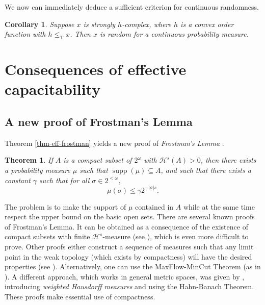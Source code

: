 \documentclass[11pt,reqno]{article}
\theoremstyle{plain}
\newtheorem{thm}{Theorem}
\newtheorem*{cor*}{Corollary}
\theoremstyle{definition}
\theoremstyle{remark}
\numberwithin{equation}{section}
\newcommand{\Cant}{\ensuremath{2^{\omega}}}
\newcommand{\Str}[1][<\omega]{\ensuremath{2^{#1}}}
\newcommand{\Hmeas}{\ensuremath{\mathcal{H}}}
\newcommand{\Hm}[1]{\ensuremath{\Hmeas^{#1}}}
\DeclareMathOperator{\T}{T}
\DeclareMathOperator{\supp}{supp}
\begin{document}
We now can immediately deduce a sufficient criterion for continuous randomness.

\begin{cor*}
	Suppose $x$ is strongly $h$-complex, where $h$ is a convex order function with $h \leq_{\T} x$. Then $x$ is random for a continuous probability measure.
\end{cor*}







% 
% 
\section{Consequences of effective capacitability} \label{sec-consequ-cap}



% 
% 
\subsection{A new proof of Frostman's Lemma} \label{ssec-new-frost}

Theorem \ref{thm-eff-frostman} yields a new proof of \emph{Frostman's Lemma} \citep{frostman:1935}. 

\begin{thm} \label{thm-frostman}
	If $A$ is a compact subset of $\Cant$ with $\Hm{s}(A) > 0$, then there exists a probability measure $\mu$ such that $\supp(\mu) \subseteq A$, and such that there exists a constant $\gamma$ such that for all $\sigma \in \Str$,
	\[
		\mu(\sigma) \leq \gamma 2^{-|\sigma|s}.
	\]
\end{thm}

The problem is to make the support of $\mu$ contained in $A$ while at the same time respect the upper bound on the basic open sets. There are several known proofs of Frostman's Lemma. It can be obtained as a consequence of the existence of compact subsets with finite $\Hm{s}$-measure (see \citep{falconer:1990}), which is even more difficult to prove. Other proofs either construct a sequence of measures such that any limit point in the weak topology (which exists by compactness) will have the desired properties (see \citep{mattila:1995}). Alternatively, one can use the MaxFlow-MinCut Theorem (as in \citep{moerters-peres:ip}). A different approach, which works in general metric spaces, was given by \citet{howroyd:1994}, introducing \emph{weighted Hausdorff measures} and using the Hahn-Banach Theorem.
These proofs make essential use of compactness.
\end{document}
